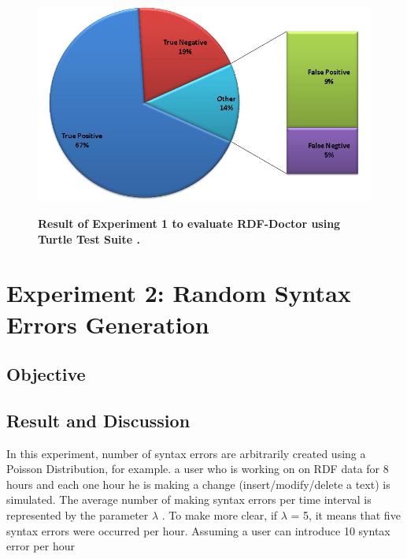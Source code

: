 \begin{figure}[ht]
\begin{center}
		\includegraphics[scale=0.5,angle=0]{images/PieChartExperiment1.png}

		\label{Fig:pieChartExperiment1}
		\caption{\textbf{Result of Experiment 1 to evaluate  RDF-Doctor using Turtle Test Suite \cite{TurtleTests:Online}.}}
\end{center}
\end{figure}

\section{Experiment 2: Random Syntax Errors Generation}
\subsection{Objective}




\subsection{Result and Discussion}

In this experiment, number of syntax errors are arbitrarily created using a Poisson Distribution, for example. a user who is working on on RDF data for 8 hours and each one hour he is making a change (insert/modify/delete a text) is simulated. The average number of making syntax errors per time interval is represented by the parameter $\lambda$ . To make more clear, if   $\lambda$ = 5, it means that five syntax errors were occurred per hour.  Assuming a user can introduce 10 syntax error per hour

